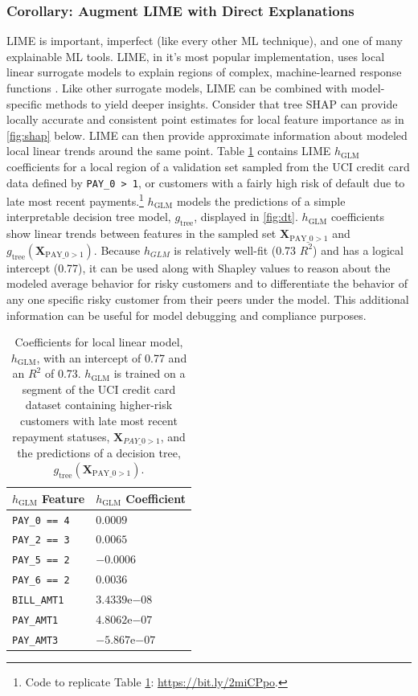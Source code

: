 \documentclass{article}
\begin{document}
\subsubsection{Corollary: Augment LIME with Direct Explanations} LIME is important, imperfect (like every other ML technique), and one of many explainable ML tools. LIME, in it's most popular implementation, uses local linear surrogate models to explain regions of complex, machine-learned response functions \cite{lime}. Like other surrogate models, LIME can be combined with model-specific methods to yield deeper insights. Consider that tree SHAP can provide locally accurate and consistent point estimates for local feature importance as in \ref{fig:shap} below. LIME can then provide approximate information about modeled local linear trends around the same point. Table \ref{tab:lime} contains LIME $h_{\text{GLM}}$ coefficients for a local region of a validation set sampled from the UCI credit card data defined by \texttt{PAY\_0 > 1}, or customers with a fairly high risk of default due to late most recent payments.\footnote{\scriptsize{Code to replicate Table \ref{tab:lime}: \url{https://bit.ly/2miCPpo}.}} $h_{\text{GLM}}$ models the predictions of a simple interpretable decision tree model, $g_{\text{tree}}$, displayed in \ref{fig:dt}. $h_{\text{GLM}}$ coefficients show linear trends between features in the sampled set $\mathbf{X}_{\text{PAY\_0} > 1}$ and $g_{\text{tree}}(\mathbf{X}_{\text{PAY\_0}> 1})$. Because $h_{GLM}$ is relatively well-fit (0.73 $R^2$) and has a logical intercept (0.77), it can be used along with Shapley values to reason about the modeled average behavior for risky customers and to differentiate the behavior of any one specific risky customer from their peers under the model. This additional information can be useful for model debugging and compliance purposes.

\begin{table}
  	\caption{Coefficients for local linear model, $h_{\text{GLM}}$, with an intercept of 0.77 and an $R^2$ of 0.73. $h_{\text{GLM}}$ is trained on a segment of the UCI credit card dataset containing higher-risk customers with late most recent repayment statuses, $\mathbf{X}_{PAY \_ 0 > 1}$, and the predictions of a decision tree, $g_{\text{tree}}(\mathbf{X}_{\text{PAY\_0} > 1})$.\\}
  	\label{tab:lime}
  	\centering
  	\begin{tabular}{ll}
    	\toprule
    	$h_{\text{GLM}}$ Feature & $h_{\text{GLM}}$ Coefficient \\
    	\midrule
		\texttt{PAY\_0 == 4} & $0.0009$ \\
		\texttt{PAY\_2 == 3} & $0.0065$ \\
		\texttt{PAY\_5 == 2} & $-0.0006$ \\
		\texttt{PAY\_6 == 2} & $0.0036$ \\			
		\texttt{BILL\_AMT1} & $3.4339\mathrm{e}{-08}$ \\
		\texttt{PAY\_AMT1} & $4.8062\mathrm{e}{-07}$ \\
		\texttt{PAY\_AMT3} & $-5.867\mathrm{e}{-07}$ \\	
    	\bottomrule
  \end{tabular}
\end{table}
\end{document}
